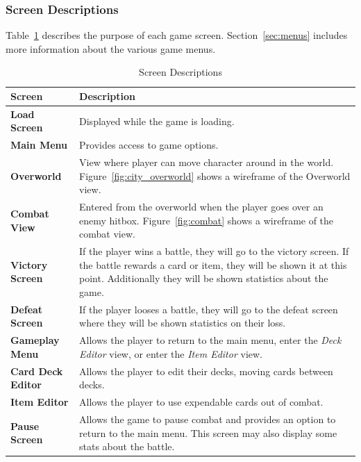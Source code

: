 \documentclass[12pt,titlepage]{article}
\begin{document}
\subsubsection{Screen Descriptions}
%
Table~\ref{tab:screen_purpose} describes the purpose of each game screen.
Section~\ref{sec:menus} includes more information about the various game menus.
\begin{table}[H]
    \centering
    \caption{Screen Descriptions}
    \label{tab:screen_purpose}
    \begin{tabularx}{\textwidth}{|l | X |}
        \hline
        \textbf{Screen} & \textbf{Description} \\
        \hline\hline
        \textbf{Load Screen} & Displayed while the game is loading. \\
        \hline
        \textbf{Main Menu} & Provides access to  game options. \\
        \hline
        \textbf{Overworld} & View where player can move character around in the
        world. Figure~\ref{fig:city_overworld} shows a wireframe of the Overworld
        view. \\
        \hline
        \textbf{Combat View} & Entered from the overworld when the player goes
        over an enemy hitbox. Figure~\ref{fig:combat} shows a wireframe of the
        combat view. \\
        \hline
        \textbf{Victory Screen} & If the player wins a battle, they will go to
        the victory screen. If the battle rewards a card or item, they will be
        shown it at this point. Additionally they will be shown statistics about
        the game. \\
        \hline
        \textbf{Defeat Screen} & If the player looses a battle, they will go to
        the defeat screen where they will be shown statistics on their loss. \\
        \hline
        \textbf{Gameplay Menu} & Allows the player to return to the main menu,
        enter the \textit{Deck Editor} view, or enter the \textit{Item Editor}
        view. \\
        \hline
        \textbf{Card Deck Editor} & Allows the player to edit their decks,
        moving cards between decks. \\
        \hline
        \textbf{Item Editor} & Allows the player to use expendable cards out of
        combat. \\
        \hline
        \textbf{Pause Screen} & Allows the game to pause combat and provides an
        option to return to the main menu. This screen may also display some
        stats about the battle. \\
        \hline
    \end{tabularx}
\end{table}
\end{document}
